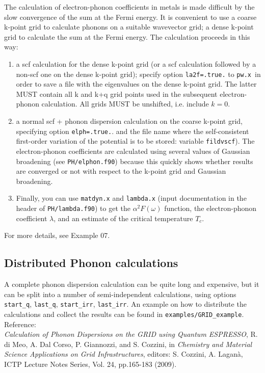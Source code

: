 \documentclass[12pt,a4paper]{article}
\def\pw.x{\texttt{pw.x}}
\begin{document}
The calculation of electron-phonon coefficients in metals is made difficult 
by the slow convergence of the sum at the Fermi energy. It is convenient to 
use a coarse k-point grid to calculate phonons on a suitable wavevector grid;
a dense k-point grid to calculate the sum at the Fermi energy. The calculation
proceeds in this way:
\begin{enumerate}
\item a scf calculation for the dense k-point grid (or a scf calculation 
followed by a non-scf one on the dense k-point grid); specify 
option \texttt{la2f=.true.} to \pw.x\ in order to save a file with 
the eigenvalues on the dense k-point grid. The latter MUST contain 
all k and k+q grid points used in the subsequent electron-phonon 
calculation. All grids MUST be unshifted, i.e. include $k=0$.
\item a normal scf + phonon dispersion calculation on the coarse k-point
grid, specifying option \texttt{elph=.true.}. and the file name where
the self-consistent first-order variation of the potential is to be 
stored: variable \texttt{fildvscf}).
The electron-phonon coefficients are calculated using several
values of Gaussian broadening (see \texttt{PH/elphon.f90}) because this quickly
shows whether results are converged or not with respect to the k-point grid
and Gaussian broadening.
\item Finally, you can use \texttt{matdyn.x} and \texttt{lambda.x} 
(input documentation in the header of \texttt{PH/lambda.f90})
to get the $\alpha^2F(\omega)$ function, the electron-phonon coefficient
$\lambda$, and an estimate of the critical temperature $T_c$.
\end{enumerate}
For more details, see Example 07.

\subsection{Distributed Phonon calculations}
A complete phonon dispersion calculation can be quite long and
expensive, but it can be split into a number of semi-independent 
calculations, using options \texttt{start\_q}, \texttt{last\_q},
\texttt{start\_irr}, \texttt{last\_irr}. An example on how to 
distribute the calculations and collect the results can be found
in \texttt{examples/GRID\_example}. Reference:\\
{\it Calculation of Phonon Dispersions on the GRID using Quantum
     ESPRESSO},
     R. di Meo, A. Dal Corso, P. Giannozzi, and S. Cozzini, in 
     {\it Chemistry and Material Science Applications on Grid Infrastructures},
     editors: S. Cozzini, A. Lagan\`a, ICTP Lecture Notes Series, 
     Vol. 24, pp.165-183 (2009). 
\end{document}
